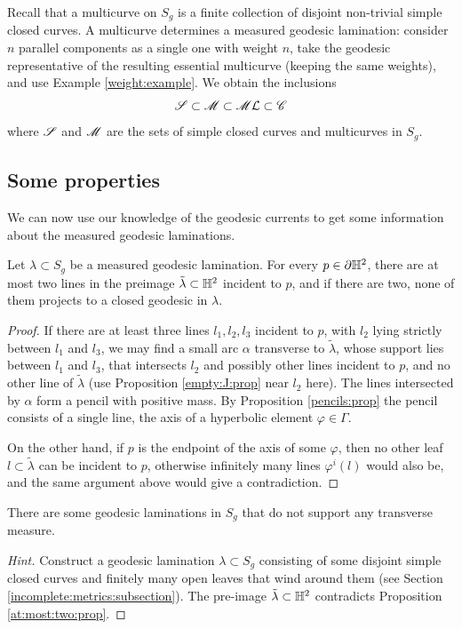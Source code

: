 Recall that a multicurve on $S_g$ is a finite collection of disjoint non-trivial simple closed curves. A multicurve determines a measured geodesic lamination: consider $n$ parallel components as a single one with weight $n$, take the geodesic representative of the resulting essential multicurve (keeping the same weights), and use Example \ref{weight:example}. We obtain the inclusions
$$\mathscr{S} \subset \mathscr{M} \subset \mathscr{M}\mathcal{L} \subset \mathscr{C}$$ 
where $\mathscr{S}$ and $\calM$ are the sets of simple closed curves and multicurves in $S_g$.\index{$\calM$} 

\subsection{Some properties}
We can now use our knowledge of the geodesic currents to get some information about the measured geodesic laminations. 

\begin{prop} \label{at:most:two:prop}
Let $\lambda\subset S_g$ be a measured geodesic lamination. For every $p\in\partial \mathbb{H}^2$, there are at most two lines in the preimage $\tilde\lambda\subset\mathbb{H}^2$ incident to $p$, and if there are two, none of them projects to a closed geodesic in $\lambda$. 
\end{prop}
\begin{proof}
If there are at least three lines $l_1, l_2, l_3$ incident to $p$, with $l_2$ lying strictly between $l_1$ and $l_3$, we may find a small arc $\alpha$ transverse to $\tilde \lambda$, whose support lies between $l_1$ and $l_3$, that intersects $l_2$ and possibly other lines incident to $p$, and no other line of $\tilde \lambda$ (use Proposition \ref{empty:J:prop} near $l_2$ here). The lines intersected by $\alpha$ form a pencil with positive mass. By Proposition \ref{pencils:prop} the pencil consists of a single line, the axis of a hyperbolic element $\varphi\in \Gamma$.

On the other hand, if $p$ is the endpoint of the axis of some $\varphi$, then no other leaf $l\subset \tilde\lambda$ can be incident to $p$, otherwise infinitely many lines $\varphi^i(l)$ would also be, and the same argument above would give a contradiction.
\end{proof}

\begin{ex}
There are some geodesic laminations in $S_g$ that do not support any transverse measure.
\end{ex}
\begin{proof}[Hint]
Construct a geodesic lamination $\lambda \subset S_g$ consisting of some disjoint simple closed curves and finitely many open leaves that wind around them (see Section \ref{incomplete:metrics:subsection}). The pre-image $\tilde\lambda\subset\mathbb{H}^2$ contradicts Proposition \ref{at:most:two:prop}.
\end{proof}


